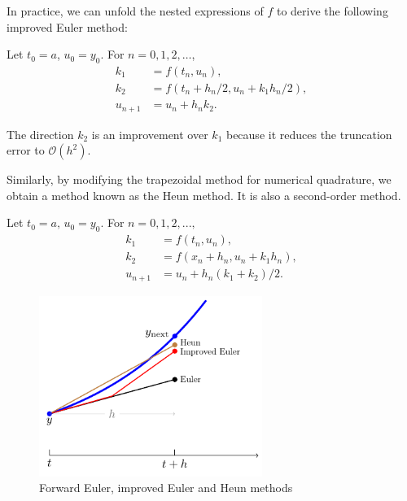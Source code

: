 \documentclass[10pt]{amsart}
\begin{document}
In practice, we can unfold the nested expressions of $f$ to derive the following improved Euler method:  

\medskip  
\begin{tcolorbox}[colframe=black!15!white, coltitle=white!5!black, title = \bf Improved Euler Method]  
Let $t_0 = a$, $u_0 = y_0$. For $n = 0, 1, 2, \dots$,  
\begin{align*}  
k_1 &= f(t_n, u_n), \\  
k_2 &= f(t_n + h_n/2, u_n + k_1 h_n/2), \\  
u_{n+1} &= u_n + h_n k_2.  
\end{align*}  
\end{tcolorbox}  

The direction $k_2$ is an improvement over $k_1$ because it reduces the truncation error to $\mathcal{O}(h^2)$.  

Similarly, by modifying the trapezoidal method for numerical quadrature, we obtain a method known as the Heun method. It is also a second-order method.  

\medskip
\begin{tcolorbox}[colframe=black!15!white, coltitle=white!5!black, title = \bf Heun Method]
Let $t_0=a,\, u_0 = y_0$. For $n=0,1,2,...,$
\begin{align*}
k_1 &= f(t_n, u_n),\\
k_2 & = f(x_n + h_n, u_n + k_1h_n),\\
u_{n+1} &= u_n + h_n (k_1 + k_2)/2.
\end{align*}
\end{tcolorbox}

\begin{figure}[htbp]
\begin{center}
\includegraphics[width=7.25cm]{figures/EulerMethod.pdf}
\caption{Forward Euler, improved Euler and Heun methods}
\label{fig:EulerMethod}
\end{center}
\end{figure}
\end{document}
